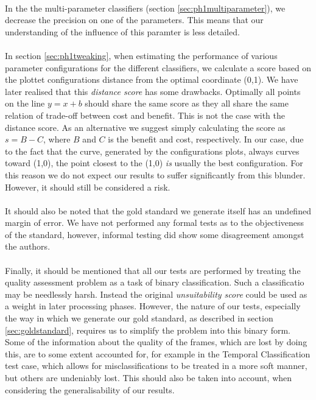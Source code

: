\\
In the the multi-parameter classifiers (section \ref{sec:ph1multiparameter}), we decrease the precision on one of the parameters. This means that our understanding of the influence of this paramter is less detailed.\\
\\
In section \ref{sec:ph1tweaking}, when estimating the performance of various parameter configurations for the different classifiers, we calculate a score based on the plottet configurations distance from the optimal coordinate (0,1). We have later realised that this \textit{distance score} has some drawbacks. Optimally all points on the line $y = x + b$ should share the same score as they all share the same relation of trade-off between cost and benefit. This is not the case with the distance score. As an alternative we suggest simply calculating the score as $s = B - C$, where $B$ and $C$ is the benefit and cost, respectively. In our case, due to the fact that the curve, generated by the configurations plots, always curves toward (1,0), the point closest to the (1,0) \textit{is} usually the best configuration. For this reason we do not expect our results to suffer significantly from this blunder. However, it should still be considered a risk.\\
\\
It should also be noted that the gold standard we generate itself has an undefined margin of error. We have not performed any formal tests as to the objectiveness of the standard, however, informal testing did show some disagreement amongst the authors.\\
\\
Finally, it should be mentioned that all our tests are performed by treating the quality assessment problem as a task of binary classification. Such a classificatio may be needlessly harsh. Instead the original \textit{unsuitability score} could be used as a weight in later processing phases. However, the nature of our tests, especially the way in which we generate our gold standard, as described in section \ref{sec:goldstandard}, requires us to simplify the problem into this binary form. Some of the information about the quality of the frames, which are lost by doing this, are to some extent accounted for, for example in the Temporal Classification test case, which allows for misclassifications to be treated in a more soft manner, but others are undeniably lost. This should also be taken into account, when considering the generalisability of our results.
%
